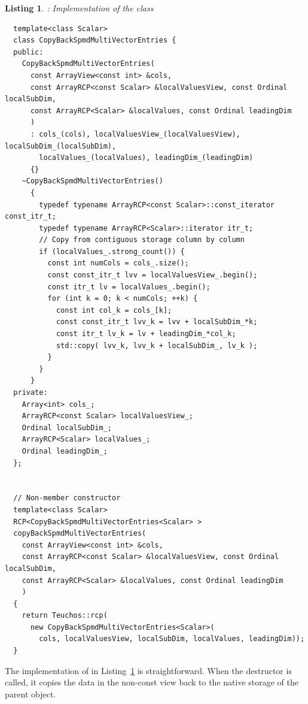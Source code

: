 \documentclass[pdf,ps2pdf,11pt]{SANDreport}
\newtheorem{listing}{Listing}
\begin{document}
{}\begin{listing}: Implementation of the class
{}
\label{listing:CopyBackSpmdMultiVectorEntries}
{\small\begin{verbatim}
  template<class Scalar>
  class CopyBackSpmdMultiVectorEntries {
  public:
    CopyBackSpmdMultiVectorEntries(
      const ArrayView<const int> &cols,
      const ArrayRCP<const Scalar> &localValuesView, const Ordinal localSubDim,
      const ArrayRCP<Scalar> &localValues, const Ordinal leadingDim
      )
      : cols_(cols), localValuesView_(localValuesView), localSubDim_(localSubDim),
        localValues_(localValues), leadingDim_(leadingDim)
      {}
    ~CopyBackSpmdMultiVectorEntries()
      {
        typedef typename ArrayRCP<const Scalar>::const_iterator const_itr_t;
        typedef typename ArrayRCP<Scalar>::iterator itr_t;
        // Copy from contiguous storage column by column
        if (localValues_.strong_count()) {
          const int numCols = cols_.size();
          const const_itr_t lvv = localValuesView_.begin();
          const itr_t lv = localValues_.begin();
          for (int k = 0; k < numCols; ++k) {
            const int col_k = cols_[k];
            const const_itr_t lvv_k = lvv + localSubDim_*k;
            const itr_t lv_k = lv + leadingDim_*col_k;
            std::copy( lvv_k, lvv_k + localSubDim_, lv_k );
          }
        }
      }
  private:
    Array<int> cols_;
    ArrayRCP<const Scalar> localValuesView_;
    Ordinal localSubDim_;
    ArrayRCP<Scalar> localValues_;
    Ordinal leadingDim_;
  };


  // Non-member constructor  
  template<class Scalar>
  RCP<CopyBackSpmdMultiVectorEntries<Scalar> >
  copyBackSpmdMultiVectorEntries(
    const ArrayView<const int> &cols,
    const ArrayRCP<const Scalar> &localValuesView, const Ordinal localSubDim,
    const ArrayRCP<Scalar> &localValues, const Ordinal leadingDim
    )
  {
    return Teuchos::rcp(
      new CopyBackSpmdMultiVectorEntries<Scalar>(
        cols, localValuesView, localSubDim, localValues, leadingDim));
  }
\end{verbatim}}
\end{listing}


The implementation of {} in
Listing~\ref{listing:CopyBackSpmdMultiVectorEntries} is
straightforward.  When the destructor is called, it copies the data in
the non-const view back to the native storage of the parent
{} object.
\end{document}
